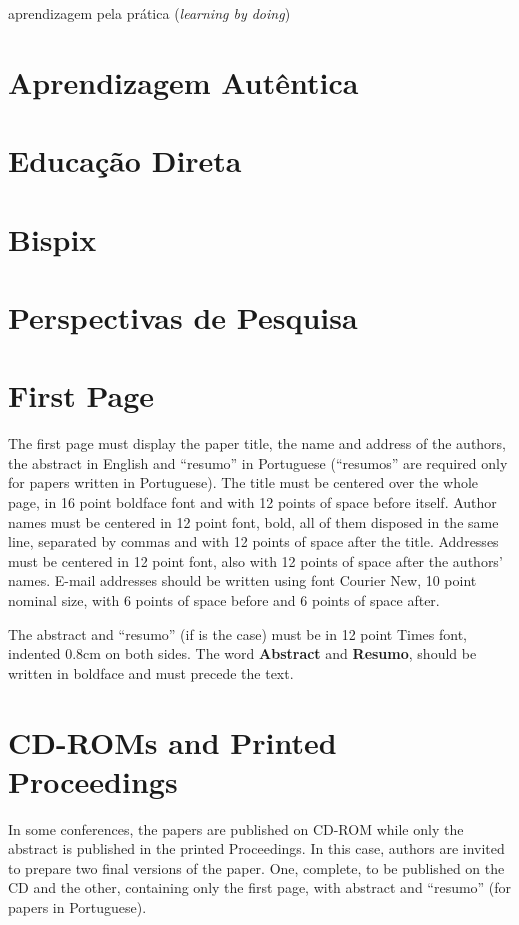 \documentclass[12pt]{article}
\begin{document}
aprendizagem pela prática ({\it learning by doing}) \cite{anzai:1979, schank:1999, benssen:2015}

\section{Aprendizagem Autêntica} \label{sec:authentic}
\section{Educação Direta} \label{sec:direct}
\section{Bispix} \label{sec:bispix}
\section{Perspectivas de Pesquisa} \label{sec:perspectivas}

\section{First Page} \label{sec:firstpage}

The first page must display the paper title, the name and address of the
authors, the abstract in English and ``resumo'' in Portuguese (``resumos'' are
required only for papers written in Portuguese). The title must be centered
over the whole page, in 16 point boldface font and with 12 points of space
before itself. Author names must be centered in 12 point font, bold, all of
them disposed in the same line, separated by commas and with 12 points of
space after the title. Addresses must be centered in 12 point font, also with
12 points of space after the authors' names. E-mail addresses should be
written using font Courier New, 10 point nominal size, with 6 points of space
before and 6 points of space after.

The abstract and ``resumo'' (if is the case) must be in 12 point Times font,
indented 0.8cm on both sides. The word \textbf{Abstract} and \textbf{Resumo},
should be written in boldface and must precede the text.

\section{CD-ROMs and Printed Proceedings}

In some conferences, the papers are published on CD-ROM while only the
abstract is published in the printed Proceedings. In this case, authors are
invited to prepare two final versions of the paper. One, complete, to be
published on the CD and the other, containing only the first page, with
abstract and ``resumo'' (for papers in Portuguese).
\end{document}
